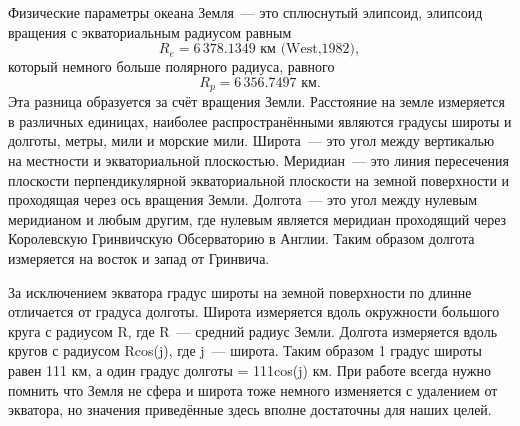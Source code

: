 
\begin{chapter}{Физические параметры океана}
Земля~--- это сплюснутый элипсоид, элипсоид вращения с экваториальным
радиусом равным 
$$
R_e=6\,378.1349\mbox{~км (West,1982)},
$$ 
который немного больше полярного радиуса, равного 
$$
 R_p=6\,356.7497\mbox{~км}.
$$
Эта разница образуется за счёт вращения Земли.
%
Расстояние на земле измеряется в различных
единицах, наиболее распространёнными являются градусы широты и
долготы, метры, мили и морские мили. Широта~--- это угол между
вертикалью на местности и экваториальной плоскостью. Меридиан~--- это
линия пересечения плоскости перпендикулярной экваториальной плоскости
на земной поверхности и проходящая через ось вращения
Земли. Долгота~--- это угол между нулевым меридианом и любым другим,
где нулевым является меридиан проходящий через Королевскую Гринвичскую
Обсерваторию в Англии. Таким образом долгота измеряется на восток и
запад от Гринвича.
%

За исключением экватора градус широты на земной поверхности по длинне
отличается от градуса долготы. Широта измеряется вдоль окружности
большого круга с радиусом R, где R~--- средний радиус Земли. Долгота
измеряется вдоль кругов с радиусом Rcos(j), где j~--- широта. Таким
образом 1 градус широты равен 111 км, а один градус долготы =
111cos(j) км. При работе всегда нужно помнить что Земля не сфера и
широта тоже немного изменяется с удалением от экватора, но значения
приведённые здесь вполне достаточны для наших целей.
%


\end{chapter}
